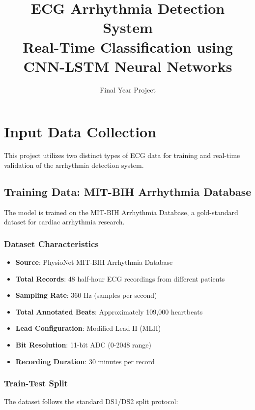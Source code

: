 \documentclass[12pt,a4paper]{article}
\title{\textbf{ECG Arrhythmia Detection System} \\ Real-Time Classification using CNN-LSTM Neural Networks}
\author{Final Year Project}
\date{}
\begin{document}
\maketitle


\section{Input Data Collection}

This project utilizes two distinct types of ECG data for training and real-time validation of the arrhythmia detection system.

\subsection{Training Data: MIT-BIH Arrhythmia Database}

The model is trained on the MIT-BIH Arrhythmia Database, a gold-standard dataset for cardiac arrhythmia research.

\subsubsection{Dataset Characteristics}

\begin{itemize}
    \item \textbf{Source}: PhysioNet MIT-BIH Arrhythmia Database
    \item \textbf{Total Records}: 48 half-hour ECG recordings from different patients
    \item \textbf{Sampling Rate}: 360 Hz (samples per second)
    \item \textbf{Total Annotated Beats}: Approximately 109,000 heartbeats
    \item \textbf{Lead Configuration}: Modified Lead II (MLII)
    \item \textbf{Bit Resolution}: 11-bit ADC (0-2048 range)
    \item \textbf{Recording Duration}: 30 minutes per record
\end{itemize}

\subsubsection{Train-Test Split}

The dataset follows the standard DS1/DS2 split protocol:
\end{document}
